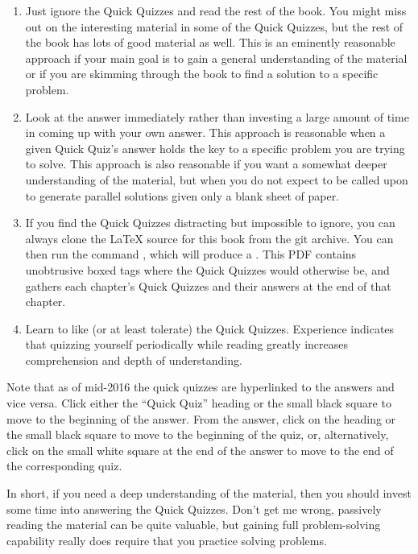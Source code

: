 {{\begin{enumerate}
\item	Just ignore the Quick Quizzes and read the rest of
	the book.
	You might miss out on the interesting material in
	some of the Quick Quizzes, but the rest of the book
	has lots of good material as well.
	This is an eminently reasonable approach if your main
	goal is to gain a general understanding of the material
	or if you are skimming through the book to find a
	solution to a specific problem.
\item	Look at the answer immediately rather than investing
	a large amount of time in coming up with your own
	answer.
	This approach is reasonable when a given Quick Quiz's
	answer holds the key to a specific problem you are
	trying to solve.
	This approach is also reasonable if you want a somewhat
	deeper understanding of the material, but when you do not
	expect to be called upon to generate parallel solutions given
	only a blank sheet of paper.
\item	If you find the Quick Quizzes distracting but impossible
	to ignore, you can always clone the \LaTeX{} source for
	this book from the git archive.
	You can then run the command , which will
	produce a .
	This PDF contains unobtrusive boxed tags where the Quick Quizzes
	would otherwise be, and gathers each chapter's Quick Quizzes
	and their answers at the end of that chapter.
\item	Learn to like (or at least tolerate) the Quick Quizzes.
	Experience indicates that quizzing yourself periodically
	while reading greatly increases comprehension and depth
	of understanding.
\end{enumerate}

Note that as of mid-2016 the quick quizzes are hyperlinked
to the answers and vice versa.
Click either the ``Quick Quiz'' heading or the small black square
to move to the beginning of the answer.
From the answer, click on the heading or the small black square to
move to the beginning of the quiz, or, alternatively, click on the
small white square at the end of the answer to move to the end of the
corresponding quiz.
}\QuickQuizEndE
}

In short, if you need a deep
understanding of the material, then you should invest some time
into answering the Quick Quizzes.
Don't get me wrong, passively reading the material can be quite
valuable, but gaining full problem-solving capability really
does require that you practice solving problems.

